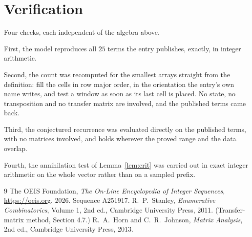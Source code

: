 \documentclass[11pt,a4paper]{article}
\theoremstyle{plain}
\theoremstyle{definition}
\begin{document}
\section{Verification}

Four checks, each independent of the algebra above.

First, the model reproduces all $25$ terms the entry publishes, exactly, in integer
arithmetic.

Second, the count was recomputed for the smallest arrays straight from the definition: fill the
cells in row major order, in the orientation the entry's own name writes, and test a window as
soon as its last cell is placed. No state, no transposition and no transfer matrix are
involved, and the published terms came back.

Third, the conjectured recurrence was evaluated directly on the published terms, with no
matrices involved, and holds wherever the proved range and the data overlap.

Fourth, the annihilation test of Lemma~\ref{lem:crit} was carried out in exact integer
arithmetic on the whole vector rather than on a sampled prefix.

\begin{thebibliography}{9}
 The OEIS Foundation, \emph{The On-Line Encyclopedia of Integer
Sequences}, \url{https://oeis.org}, 2026. Sequence A251917.
 R.~P.~Stanley, \emph{Enumerative Combinatorics}, Volume 1, 2nd ed.,
Cambridge University Press, 2011. (Transfer-matrix method, Section 4.7.)
 R.~A.~Horn and C.~R.~Johnson, \emph{Matrix Analysis}, 2nd ed., Cambridge
University Press, 2013.
\end{thebibliography}
\end{document}
